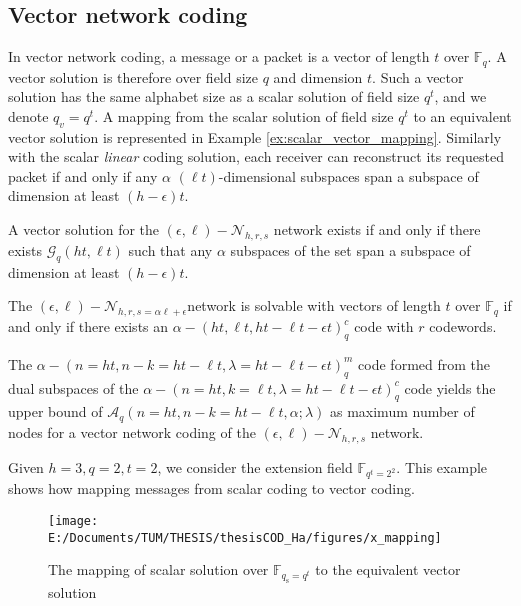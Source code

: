 \subsection{Vector network coding \label{subsec:Vector-network-coding}}

In vector network coding, a message or a packet is a vector of length
$t$ over $\ensuremath{\mathbb{F}}_{q}$. A vector solution is therefore
over field size $q$ and dimension $t$. Such a vector solution has
the same alphabet size as a scalar solution of field size $q^{t}$,
and we denote $q_{v}=q^{t}$. A mapping from the scalar solution of
field size $q^{t}$ to an equivalent vector solution is represented
in Example \ref{ex:scalar_vector_mapping}. Similarly with the scalar
\textit{linear} coding solution, each receiver can reconstruct its
requested packet if and only if any $\alpha$ $\left(\ell t\right)$-dimensional
subspaces span a subspace of dimension at least $\left(h-\epsilon\right)t$.
\begin{thm}
 A vector solution for the $(\epsilon,\ell)-\mathcal{N}_{h,r,s}$
network exists if and only if there exists $\mathcal{G}_{q}\left(ht,\ell t\right)$
such that any $\alpha$ subspaces of the set span a subspace of dimension
at least $\left(h-\epsilon\right)t$. 
\end{thm}
%
\begin{thm}
 The $(\epsilon,\ell)-\mathcal{N}_{h,r,s=\alpha\ell+\epsilon}$network
is solvable with vectors of length $t$ over $\ensuremath{\mathbb{F}}_{q}$
if and only if there exists an $\alpha-\left(ht,\ell t,ht-\ell t-\epsilon t\right)_{q}^{c}$
code with $r$ codewords. 
\end{thm}
\begin{cor}
The $\alpha-\left(n=ht,n-k=ht-\ell t,\lambda=ht-\ell t-\epsilon t\right)_{q}^{m}$
code formed from the dual subspaces of the $\alpha-\left(n=ht,k=\ell t,\lambda=ht-\ell t-\epsilon t\right)_{q}^{c}$
code yields the upper bound of $\mathcal{A}_{q}\left(n=ht,n-k=ht-\ell t,\alpha;\lambda\right)$
as maximum number of nodes for a vector network coding of the $(\epsilon,\ell)-\mathcal{N}_{h,r,s}$
network. \label{cor:dual_subspaces}
\end{cor}
\begin{example}
\label{ex:scalar_vector_mapping} 

Given $h=3,q=2,t=2$, we consider the extension field $\ensuremath{\mathbb{F}}_{q^{t}=2^{2}}$.
This example shows how mapping messages from scalar coding to vector
coding.
\end{example}
\begin{figure}[H]
\caption{The mapping of scalar solution over $\ensuremath{\mathbb{F}}_{q_{\mathrm{s}}=q^{t}}$
to the equivalent vector solution\label{fig:x_mapping}}

\centering{}\texttt{[image: E:/Documents/TUM/THESIS/thesisCOD\_Ha/figures/x\_mapping]}
\end{figure}

